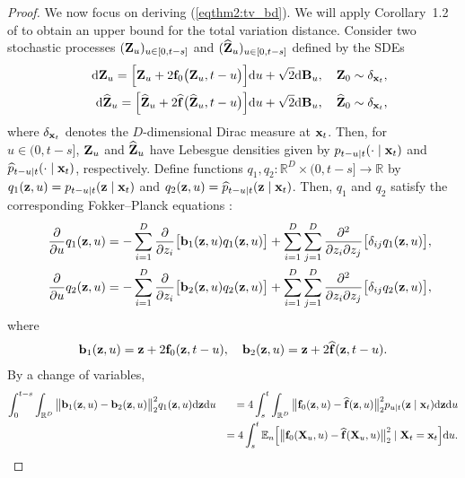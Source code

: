 \documentclass[11pt,a4paper,final]{article}
\numberwithin{equation}{section}
\theoremstyle{remark}
\newcommand{\bb}{{\bf b}}
\newcommand{\bB}{{\bf B}}
\newcommand{\bff}{{\bf f}}
\newcommand{\bx}{{\bf x}}
\newcommand{\bX}{{\bf X}}
\newcommand{\bz}{{\bf z}}
\newcommand{\bZ}{{\bf Z}}
\newcommand{\bbE}{{\mathbb E}}
\newcommand{\bbR}{{\mathbb R}}
\newcommand{\bean}{\setlength\arraycolsep{1pt}\begin{eqnarray*}}
\newcommand{\eean}{\end{eqnarray*}}
\def\d{{\rm d}}
\begin{document}
\begin{proof}
We now focus on deriving (\ref{eqthm2:tv_bd}).
We will apply Corollary~1.2 of \cite{bogachev2016distances} to obtain an upper bound for the total variation distance.
Consider two stochastic processes $( \bZ_{u})_{u \in [0, t - s] } $ and $( \widehat \bZ_{u})_{u \in [0, t - s ] } $ defined by the SDEs
\bean
&& \d  \bZ_{u} = \Big[  \bZ_{u} + 2  \bff_0 \big(  \bZ_{u}, t - u \big) \Big] \d u + \sqrt{2} \d \bB_u,\quad  \bZ_0 \sim \delta_{\bx_{t}},
\\
&& \d \widehat \bZ_{u} = \Big[ \widehat \bZ_{u} + 2 \widehat \bff \big( \widehat \bZ_{u}, t - u \big) \Big] \d u + \sqrt{2} \d \bB_u,\quad \widehat \bZ_0 \sim \delta_{\bx_{t}},
\eean
where $\delta_{\bx_{t}}$ denotes the $D$-dimensional Dirac measure at $\bx_{t}$.
Then, for $u \in (0,t-s]$, $\bZ_{u}$ and $\widehat \bZ_{u}$ have Lebesgue densities given by $p_{t-u \mid t} (\cdot \mid \bx_{t})$ and $\widehat p_{t-u \mid t}(\cdot \mid \bx_{t})$, respectively.
Define functions $q_1, q_2 : \bbR^{D} \times (0, t-s ] \rightarrow \bbR $ by $q_1(\bz,u) = p_{t-u \mid t}(\bz \mid \bx_{t} )$ and $q_2(\bz,u) = \widehat p_{t-u \mid t} (\bz \mid \bx_{t} )$.
Then, $q_1$ and $q_2$ satisfy the corresponding Fokker--Planck equations  \citep{lebris2008existence, bogachev2022fokker, pavliotis2014stochastic} :
\bean
&& \frac{\partial }{\partial u} q_1(\bz,u) = - \sum_{i=1}^{D} \frac{\partial}{\partial z_i} \big[ \bb_1 (\bz,u) q_1(\bz,u) \big] + \sum_{i=1}^{D} \sum_{j=1}^{D} \frac{\partial^2}{\partial z_i \partial z_j} \big[ \delta_{ij} q_1(\bz,u) \big],
\\
&& \frac{\partial }{\partial u} q_2(\bz,u) = - \sum_{i=1}^{D} \frac{\partial}{\partial z_i} \big[ \bb_2 (\bz,u) q_2(\bz,u) \big] + \sum_{i=1}^{D} \sum_{j=1}^{D} \frac{\partial^2}{\partial z_i \partial z_j} \big[ \delta_{ij} q_2(\bz,u) \big],
\eean
where
\bean
\bb_1 (\bz,u) =  \bz + 2 \bff_{0} (\bz, t-u),
\quad 
\bb_2 (\bz,u) =  \bz + 2  \widehat \bff( \bz, t-u).
\eean
By a change of variables,
\bean
\int_{0}^{t-s}
\int_{\bbR^{D}} 
\big\| \bb_{1}(\bz,u) - \bb_{2}(\bz,u) \big\|_2^2 q_1(\bz,u)
\d \bz \d u
&& = 4 \int_{s}^{t}
\int_{\bbR^{D}} 
\big\| \bff_{0}(\bz,u) - \widehat \bff(\bz,u) \big\|_2^2 p_{u\mid t}(\bz \mid \bx_{t})
\d \bz \d u
\\
&& = 4 \int_{s}^{t}
\bbE_{n} \Big[
\big\| \bff_{0}( \bX_{u} ,u) - \widehat \bff( \bX_{u} ,u ) \big\|_2^2 \mid \bX_{t} = \bx_{t} \Big] \d u.
\eean


\end{proof}
\end{document}

